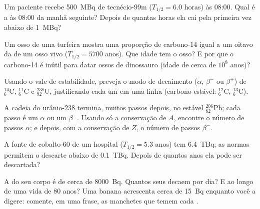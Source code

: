 \begin{exercise}[$\star\star$]\label{exo:g11:nucleus-radioactivity:9}
Um paciente recebe \qty{500}{MBq} de tecnécio-99m ($T_{1/2} = 6.0$ horas)
às 08:00. Qual é a  às 08:00 da manhã seguinte? Depois de
quantas horas ela cai pela primeira vez abaixo de \qty{1}{MBq}?
\end{exercise}

\begin{exercise}[$\star\star$]\label{exo:g11:nucleus-radioactivity:10}
Um osso de uma turfeira mostra uma proporção de carbono-14 igual a um
oitavo da de um osso vivo ($T_{1/2} = \num{5700}$ anos). Que idade tem o
osso? E por que o carbono-14 é inútil para datar ossos de dinossauro
(idade de cerca de $10^{8}$ anos)?
\end{exercise}

\begin{exercise}[$\star\star$]\label{exo:g11:nucleus-radioactivity:11}
Usando o vale de estabilidade, preveja o modo de decaimento ($\alpha$,
$\beta^-$ ou $\beta^+$) de ${}^{14}_{6}\mathrm{C}$,
${}^{11}_{6}\mathrm{C}$ e ${}^{238}_{92}\mathrm{U}$, justificando cada um
em uma linha (carbono estável: ${}^{12}_{6}\mathrm{C}$,
${}^{13}_{6}\mathrm{C}$).
\end{exercise}

\begin{exercise}[$\star\star\star$]\label{exo:g11:nucleus-radioactivity:12}
A cadeia do urânio-238 termina, muitos passos depois, no estável
${}^{206}_{82}\mathrm{Pb}$; cada passo é um $\alpha$ ou um $\beta^-$.
Usando só a conservação de $A$, encontre o número de passos $\alpha$; e
depois, com a conservação de $Z$, o número de passos $\beta^-$.
\end{exercise}

\begin{exercise}[$\star\star\star$]\label{exo:g11:nucleus-radioactivity:13}
A fonte de cobalto-60 de um hospital ($T_{1/2} = 5.3$ anos) tem 
\qty{6.4}{TBq}; as normas permitem o descarte abaixo de \qty{0.1}{TBq}.
Depois de quantos anos ela pode ser descartada?
\end{exercise}

\begin{exercise}[$\star\star\star$]\label{exo:g11:nucleus-radioactivity:14}
A  do seu corpo é de cerca de \qty{8000}{Bq}. Quantos 
seus decaem por dia? E ao longo de uma vida de $80$ anos? Uma banana
acrescenta cerca de \qty{15}{Bq} enquanto você a digere: comente, em uma
frase, as manchetes que temem cada .
\end{exercise}

